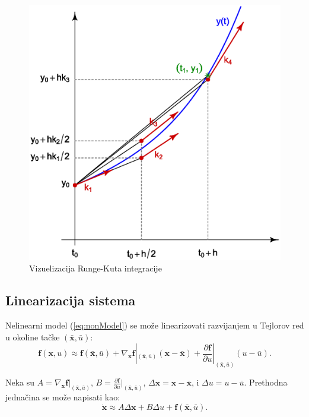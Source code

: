 \documentclass[a4paper,11pt]{article}
\theoremstyle{definition} \newtheorem{deff}{Definicija}[section]
\theoremstyle{definition} \newtheorem{prim}[deff]{Primer}
\theoremstyle{plain} \newtheorem{teor}[deff]{Teorema}
\newcommand{\vect}[1]{\boldsymbol{\mathbf{#1}}}
\begin{document}
	
	
	
	\begin{figure}[!htb]
		\centering
			\includegraphics[width=0.45\linewidth]{slike/Runge_Kutta_slopes.eps}
			\caption{}
			\label{fig:RK4}
		
		\caption{Vizuelizacija Runge-Kuta integracije}
	\end{figure}
	
	
	
	
	
	
	\clearpage
	
	
	
	
	\subsection{Linearizacija sistema}
	\label{sec:linearizacija}
	
	Nelinearni model (\ref{eq:nonModel}) se može linearizovati razvijanjem u Tejlorov red u okoline tačke $(\vect{\bar{x}}, \bar{u})$:
	\begin{equation}
		\mathbf{f}(\mathbf{x}, u) \approx \mathbf{f}(\mathbf{\bar{x}}, \bar{u}) + \nabla_{\vect{x}} \mathbf{f}|_{(\vect{\bar{x}},\bar{u})} (\mathbf{x} - \mathbf{\bar{x}}) + \frac{\partial \mathbf{f}}{\partial u}|_{(\mathbf{\bar{x}},\bar{u})} (u - \bar{u}). \label{eq:linearization}
	\end{equation}
	
	Neka su $A = \nabla_{\mathbf{x}} \mathbf{f}|_{(\bar{\mathbf{x}},\bar{u})}$, $B = \frac{\partial \mathbf{f}}{\partial u}|_{(\bar{\mathbf{x}},\bar{u})}$, $\Delta \mathbf{x} = \mathbf{x} - \bar{\mathbf{x}}$, i $\Delta u = u - \bar{u}$.
	Prethodna jednačina se može napisati kao:
	\begin{equation}
		\dot{\mathbf{x}} \approx A\Delta \mathbf{x} + B\Delta u + \vect{f}(\bar{\mathbf{x}}, \bar{u}). \label{eq:linearized_system}
	\end{equation}
	
\end{document}
